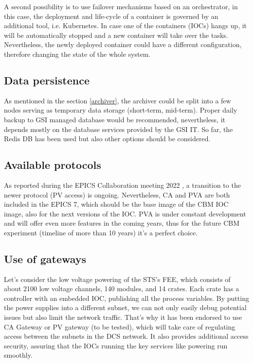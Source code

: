 A second possibility is to use failover mechanisms based on an orchestrator, in this case, the deployment and life-cycle of a container is governed by an additional tool, i.e. Kubernetes. In case one of the containers (IOCs) hangs up, it will be automatically stopped and a new container will take over the tasks. Nevertheless, the newly deployed container could have a different configuration, therefore changing the state of the whole system. 


\subsection{Data persistence}

As mentioned in the section \ref{archiver}, the archiver could be split into a few nodes serving as temporary data storage (short-term, mid-term). Proper daily backup to GSI managed database would be recommended, nevertheless, it depends mostly on the database services provided by the GSI IT. So far, the Redis DB has been used but also other options should be considered. 

\subsection{Available protocols}
As reported during the EPICS Collaboration meeting 2022 \cite{epics_2022}, a transition to the newer protocol (PV access) is ongoing. Nevertheless, CA and PVA are both included in the EPICS 7, which should be the base image of the CBM IOC image, also for the next versions of the IOC. PVA is under constant development and will offer even more features in the coming years, thus for the future CBM experiment (timeline of more than 10 years) it's a perfect choice. 

\subsection{Use of gateways}
Let's consider the low voltage powering of the STS's FEE, which consists of about 2100 low voltage channels, 140 modules, and 14 crates. Each crate has a controller with an embedded \gls{IOC}, publishing all the process variables. By putting the power supplies into a different subnet, we can not only easily debug potential issues but also limit the network traffic. That's why it has been endorsed to use CA Gateway \cite{gateway} or PV gateway (to be tested), which will take care of regulating access between the subnets in the DCS network. It also provides additional access security, assuring that the IOCs running the key services like powering run smoothly.

